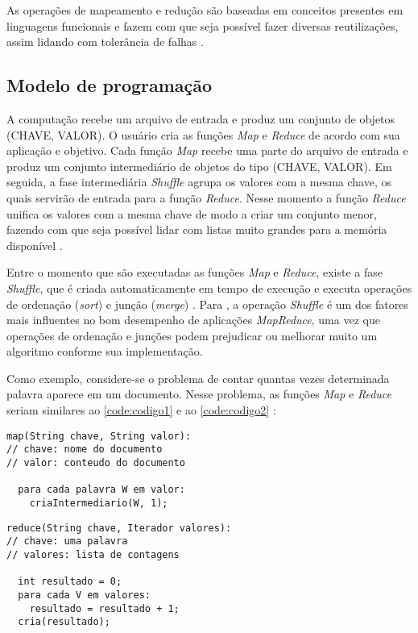 As operações de mapeamento e redução são baseadas em conceitos presentes em linguagens funcionais e fazem com que seja possível fazer diversas reutilizações, assim lidando com tolerância de falhas \cite{MapReduce08}.

\subsection{Modelo de programação}\label{ssec:mapreducemodelo}

A computação recebe um arquivo de entrada e produz um conjunto de objetos (CHAVE, VALOR). O usuário cria as funções \textit{Map} e \textit{Reduce} de acordo com sua aplicação e objetivo. Cada função \textit{Map} recebe uma parte do arquivo de entrada e produz um conjunto intermediário de objetos do tipo (CHAVE, VALOR). Em seguida, a fase intermediária \textit{Shuffle} agrupa os valores com a mesma chave, os quais servirão de entrada para a função \textit{Reduce}. Nesse momento a função \textit{Reduce} unifica os valores com a mesma chave de modo a criar um conjunto menor, fazendo com que seja possível lidar com listas muito grandes para a memória disponível \cite{MapReduce08}. 

Entre o momento que são executadas as funções \textit{Map} e \textit{Reduce}, existe a fase \textit{Shuffle}, que é criada automaticamente em tempo de execução e executa operações de ordenação (\textit{sort}) e junção (\textit{merge}) \cite{ProHadoop09}. Para \textcite{HadoopBook15}, a operação \textit{Shuffle} é um dos fatores mais influentes no bom desempenho de aplicações \textit{MapReduce}, uma vez que operações de ordenação e junções podem prejudicar ou melhorar muito um algoritmo conforme sua implementação.

Como exemplo, considere-se o problema de contar quantas vezes determinada palavra aparece em um documento. Nesse problema, as funções \textit{Map} e \textit{Reduce} seriam similares ao \autoref{code:codigo1} e ao \autoref{code:codigo2} \cite{MapReduce08}:

\begin{lstlisting}[caption={Exemplo de função Map em pseudocódigo adaptado de \cite{MapReduce08}}, label=code:codigo1]
map(String chave, String valor):
// chave: nome do documento
// valor: conteudo do documento

  para cada palavra W em valor:
    criaIntermediario(W, 1);
\end{lstlisting}

\begin{lstlisting}[caption={Exemplo de função Reduce em pseudocódigo adaptado de \cite{MapReduce08}}, label=code:codigo2]
reduce(String chave, Iterador valores):
// chave: uma palavra
// valores: lista de contagens

  int resultado = 0;
  para cada V em valores:
    resultado = resultado + 1;
  cria(resultado);
\end{lstlisting}

